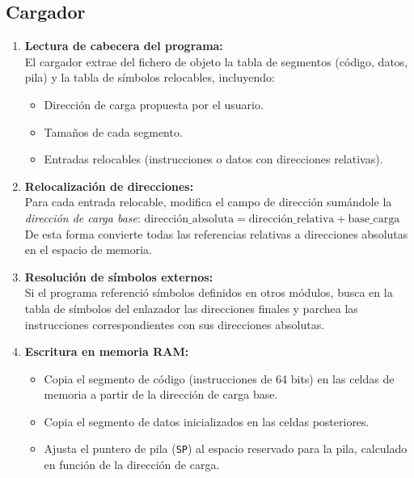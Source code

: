 \documentclass{article}
\begin{document}
\subsection{Cargador}

\begin{enumerate}
  \item \textbf{Lectura de cabecera del programa:}\\
        El cargador extrae del fichero de objeto la tabla de segmentos (código, datos, pila) y la tabla de símbolos relocables, incluyendo:
        \begin{itemize}
          \item Dirección de carga propuesta por el usuario.
          \item Tamaños de cada segmento.
          \item Entradas relocables (instrucciones o datos con direcciones relativas).
        \end{itemize}

  \item \textbf{Relocalización de direcciones:}\\
        Para cada entrada relocable, modifica el campo de dirección sumándole la \emph{dirección de carga base}:
        $       \text{dirección\_absoluta} = \text{dirección\_relativa} + \text{base\_carga}
        $
        De esta forma convierte todas las referencias relativas a direcciones absolutas en el espacio de memoria.

  \item \textbf{Resolución de símbolos externos:}\\
        Si el programa referenció símbolos definidos en otros módulos, busca en la tabla de símbolos del enlazador las direcciones finales y parchea las instrucciones correspondientes con sus direcciones absolutas.

  \item \textbf{Escritura en memoria RAM:}\\
        \begin{itemize}
          \item Copia el segmento de código (instrucciones de 64 bits) en las celdas de memoria a partir de la dirección de carga base.
          \item Copia el segmento de datos inicializados en las celdas posteriores.
          \item Ajusta el puntero de pila (\texttt{SP}) al espacio reservado para la pila, calculado en función de la dirección de carga.
        \end{itemize}


\end{enumerate}
\end{document}
